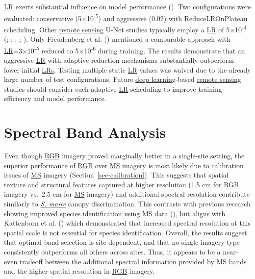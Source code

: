\documentclass[
]{scrreprt}
\begin{document}
\hyperref[acronyms_LR]{LR} exerts substantial influence on model
performance (). Two configurations were evaluated: conservative
(5×10\textsuperscript{-5}) and aggressive (0.02) with ReduceLROnPlateau
scheduling. Other \hyperref[acronyms_RS]{remote sensing} U-Net studies
typically employ a \hyperref[acronyms_LR]{LR} of
5×10\textsuperscript{-4}
(; ;
;
;
). Only
Freudenberg et al. ()
mentioned a comparable approach with
\hyperref[acronyms_LR]{LR}=3×10\textsuperscript{-5} reduced to
5×10\textsuperscript{-6} during training. The results demonstrate that
an aggressive \hyperref[acronyms_LR]{LR} with adaptive reduction
mechanisms substantially outperform lower initial
\hyperref[acronyms_LR]{LRs}. Testing multiple static
\hyperref[acronyms_LR]{LR} values was waived due to the already large
number of test configurations. Future \hyperref[acronyms_DL]{deep
learning}-based \hyperref[acronyms_RS]{remote sensing} studies should
consider such adaptive \hyperref[acronyms_LR]{LR} scheduling to improve
training efficiency and model performance.

\section{Spectral Band Analysis}\label{spectral-band-analysis}

Even though \hyperref[acronyms_RGB]{RGB} imagery proved marginally
better in a single-site setting, the superior performance of
\hyperref[acronyms_RGB]{RGB} over \hyperref[acronyms_MS]{MS} imagery is
most likely due to calibration issues of \hyperref[acronyms_MS]{MS}
imagery (Section~\ref{sec-calibration}). This suggests that spatial
texture and structural features captured at higher resolution (1.5 cm
for \hyperref[acronyms_RGB]{RGB} imagery vs.~2.5 cm for
\hyperref[acronyms_MS]{MS} imagery) and additional spectral resolution
contribute similarly to \hyperref[acronyms_SM]{\emph{S. maire}} canopy
discrimination. This contrasts with previous research showing improved
species identification using \hyperref[acronyms_MS]{MS} data
(), but
aligns with Kattenborn et al.
() which
demonstrated that increased spectral resolution at this spatial scale is
not essential for species identification. Overall, the results suggest
that optimal band selection is site-dependent, and that no single
imagery type consistently outperforms all others across sites. Thus, it
appears to be a near-even tradeoff between the additional spectral
information provided by \hyperref[acronyms_MS]{MS} bands and the higher
spatial resolution in \hyperref[acronyms_RGB]{RGB} imagery.
\end{document}
